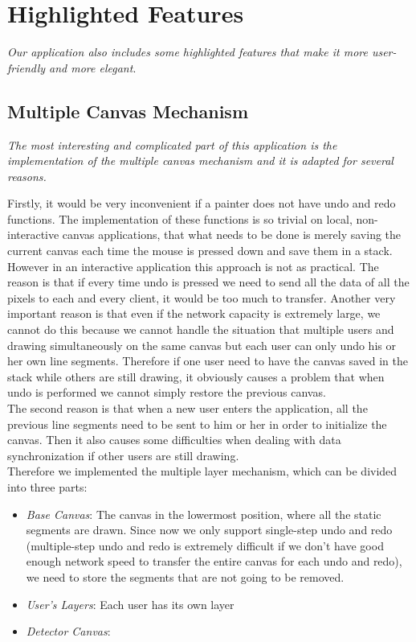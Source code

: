 \documentclass[a4paper,11pt,3p]{article}
\begin{document}
\section{Highlighted Features}
\emph{Our application also includes some highlighted features that make it more user-friendly and 
more elegant}.\\

\subsection{Multiple Canvas Mechanism}
\emph{The most interesting and complicated part of this application is the implementation of the multiple canvas 
mechanism and it is adapted for several reasons.}

Firstly, it would be very inconvenient if a painter does not have undo and redo functions. 
The implementation of these functions is so trivial on local, non-interactive canvas applications, 
that what needs to be done is merely saving the current canvas each time the mouse is pressed 
down and save them in a stack. However in an interactive application this approach is not as 
practical. The reason is that if every time undo is pressed we need to send all the data of 
all the pixels to each and every client, it would be too much to transfer. Another very important 
reason is that even if the network capacity is extremely large, we cannot do this because we cannot 
handle the situation that multiple users and drawing simultaneously on the same canvas but each user 
can only undo his or her own line segments. Therefore if one user need to have the canvas saved in the 
stack while others are still drawing, it obviously causes a problem that when undo is performed we cannot 
simply restore the previous canvas.\\

The second reason is that when a new user enters the application, all the previous line segments need to 
be sent to him or her in order to initialize the canvas. Then it also causes some difficulties 
when dealing with data synchronization if other users are still drawing.\\

Therefore we implemented the multiple layer mechanism, which can be divided into three parts:\\
\begin{itemize}
\item
\emph{Base Canvas}: The canvas in the lowermost position, where all the static segments are drawn. 
Since now we only support single-step undo and redo (multiple-step undo and redo is extremely 
difficult if we don't have good enough network speed to transfer the entire canvas for each undo and 
redo), we need to store the segments that are not going to be removed.\\
\item
\emph{User's Layers}: Each user has its own layer
\item
\emph{Detector Canvas}:
\end{itemize}
\end{document}
